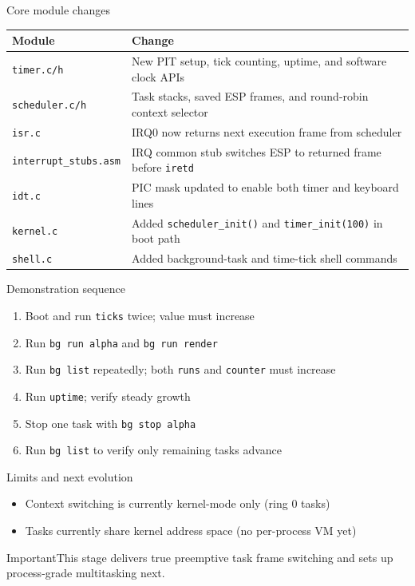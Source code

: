 \documentclass[aspectratio=169]{beamer}
\newcommand{\warn}[1]{%
  \begin{alertblock}{Important}\smallskip #1\smallskip\end{alertblock}\vspace{5pt}}
\begin{document}
\begin{frame}{Core module changes}
  \small
  \begin{tabular}{@{}p{2.7cm}p{9.3cm}@{}}
    \toprule
    \textbf{Module} & \textbf{Change} \\
    \midrule
    \texttt{timer.c/h} & New PIT setup, tick counting, uptime, and software clock APIs \\
    \texttt{scheduler.c/h} & Task stacks, saved ESP frames, and round-robin context selector \\
    \texttt{isr.c} & IRQ0 now returns next execution frame from scheduler \\
    \texttt{interrupt\_stubs.asm} & IRQ common stub switches ESP to returned frame before \texttt{iretd} \\
    \texttt{idt.c} & PIC mask updated to enable both timer and keyboard lines \\
    \texttt{kernel.c} & Added \texttt{scheduler\_init()} and \texttt{timer\_init(100)} in boot path \\
    \texttt{shell.c} & Added background-task and time-tick shell commands \\
    \bottomrule
  \end{tabular}
\end{frame}

\begin{frame}{Demonstration sequence}
  \begin{enumerate}
    \item Boot and run \texttt{ticks} twice; value must increase
    \item Run \texttt{bg run alpha} and \texttt{bg run render}
    \item Run \texttt{bg list} repeatedly; both \texttt{runs} and \texttt{counter} must increase
    \item Run \texttt{uptime}; verify steady growth
    \item Stop one task with \texttt{bg stop alpha}
    \item Run \texttt{bg list} to verify only remaining tasks advance
  \end{enumerate}
\end{frame}

\begin{frame}{Limits and next evolution}
  \begin{itemize}
    \item Context switching is currently kernel-mode only (ring 0 tasks)
    \item Tasks currently share kernel address space (no per-process VM yet)
  \end{itemize}
  \warn{This stage delivers true preemptive task frame switching and sets up process-grade multitasking next.}
\end{frame}
\end{document}
